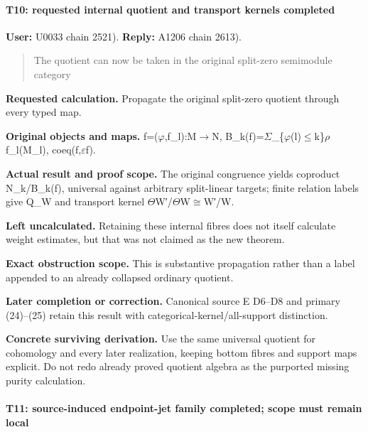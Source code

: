 \paragraph{T10: requested internal quotient and transport kernels
completed}\label{t10-requested-internal-quotient-and-transport-kernels-completed}

\textbf{User:} U0033
\protect{} chain 2521).
\textbf{Reply:} A1206
\protect{} chain 2613).

\begin{quote}
The quotient can now be taken in the original split-zero semimodule
category
\end{quote}

\textbf{Requested calculation.} Propagate the original split-zero
quotient through every typed map.

\textbf{Original objects and maps.}
f=(\allowbreak{}\ensuremath{φ}\allowbreak{},f\_l):M\allowbreak{}\ensuremath{→}\allowbreak{}N,
B\_k(f)=\allowbreak{}\ensuremath{Σ}\allowbreak{}\_\{\allowbreak{}\ensuremath{φ}\allowbreak{}(l)\allowbreak{}\ensuremath{≤}\allowbreak{}k\}\allowbreak{}\ensuremath{ρ}\allowbreak{}
f\_l(M\_l), coeq(f,\allowbreak{}\ensuremath{ε}\allowbreak{}f).

\textbf{Actual result and proof scope.} The original congruence yields
coproduct N\_k/B\_k(f), universal against arbitrary split-linear
targets; finite relation labels give Q\_W and transport kernel
\allowbreak{}\ensuremath{Θ}\allowbreak{}W′/\allowbreak{}\ensuremath{Θ}\allowbreak{}W\allowbreak{}\ensuremath{≅}\allowbreak{}W′/W.

\textbf{Left uncalculated.} Retaining these internal fibres does not
itself calculate weight estimates, but that was not claimed as the new
theorem.

\textbf{Exact obstruction scope.} This is substantive propagation rather
than a label appended to an already collapsed ordinary quotient.

\textbf{Later completion or correction.} Canonical source E D6--D8 and
primary (24)--(25) retain this result with
categorical-kernel/all-support distinction.

\textbf{Concrete surviving derivation.} Use the same universal quotient
for cohomology and every later realization, keeping bottom fibres and
support maps explicit. Do not redo already proved quotient algebra as
the purported missing purity calculation.

\paragraph{T11: source-induced endpoint-jet family completed; scope must
remain
local}\label{t11-source-induced-endpoint-jet-family-completed-scope-must-remain-local}

